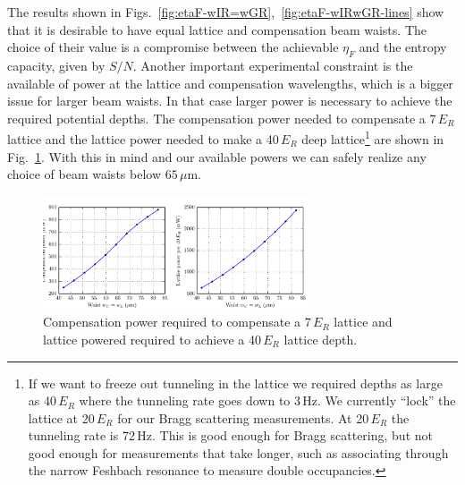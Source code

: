 \documentclass[11pt,letter]{article}
\begin{document}


The results shown in Figs.~\ref{fig:etaF-wIR=wGR},~\ref{fig:etaF-wIRwGR-lines}
show that it is desirable to have equal lattice and compensation beam waists.
The choice of their value is a compromise between the achievable $\eta_{F}$ and
the entropy capacity, given by $S/N$.   Another important experimental
constraint is the available of power at the lattice and compensation
wavelengths, which is a bigger issue for larger beam waists.  In that case
larger power is necessary to achieve the required potential depths.   The
compensation power needed to compensate a 7\,$E_{R}$ lattice and the lattice
power needed to make a 40\,$E_{R}$ deep lattice\footnote{If we want to freeze
out tunneling in the lattice we required depths as large as 40\,$E_{R}$ where
the tunneling rate goes down to 3\,Hz.  We currently ``lock'' the lattice at
20\,$E_{R}$ for our Bragg scattering measurements.  At 20\,$E_{R}$ the
tunneling rate is 72\,Hz. This is good enough for Bragg scattering, but not
good enough for measurements that take longer, such as associating through the
narrow Feshbach resonance to measure double occupancies. } are shown in
Fig.~\ref{fig:green-power-wIR=wGR}.   With this in mind and our available
powers we can safely realize any choice of beam waists below $65\,\mu$m. 
\begin{figure}
    \centering
\includegraphics[width=0.7\textwidth]{figures/green-power-wIR=wGR.png}
\caption{ Compensation power required to compensate a 7\,$E_{R}$ lattice and
lattice powered required to achieve a 40\,$E_{R}$ lattice depth.  }
\label{fig:green-power-wIR=wGR}
\end{figure}
\end{document}
